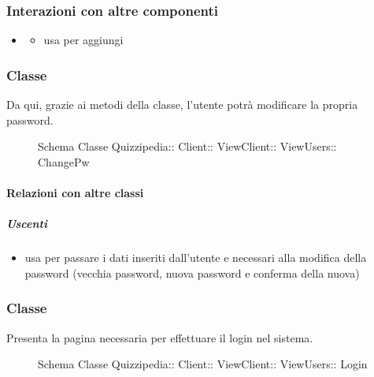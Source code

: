 \subsubsection{Interazioni con altre componenti}
\begin{itemize}
\item {}
\begin{itemize}
\item usa  per aggiungi
\end{itemize}
\end{itemize}
\subsubsection{Classe }
Da qui, grazie ai metodi della classe, l'utente potrà modificare la propria password.
\begin{figure}[H]
\centering
\noindent{}
\caption[Schema Classe ChangePw]{Schema Classe Quizzipedia:: Client:: ViewClient:: ViewUsers:: ChangePw}
\end{figure}
\paragraph{Relazioni con altre classi}
\subparagraph{Uscenti}
\begin{itemize}
\item usa  per passare i dati inseriti dall'utente e necessari alla modifica della password (vecchia password, nuova password e conferma della nuova)
\end{itemize}
\subsubsection{Classe }
Presenta la pagina necessaria per effettuare il login nel sistema.
\begin{figure}[H]
\centering
\noindent{}
\caption[Schema Classe Login]{Schema Classe Quizzipedia:: Client:: ViewClient:: ViewUsers:: Login}
\end{figure}

